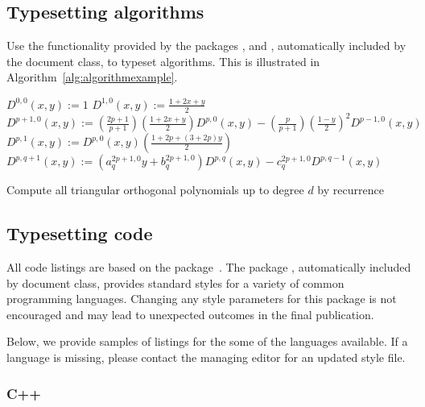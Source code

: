 \documentclass{ansarticle}
\begin{document}
\subsection{Typesetting algorithms}

Use the functionality provided by the packages ,
 and , automatically included by
the  document class, to typeset algorithms. This is
illustrated in Algorithm~\ref{alg:algorithmexample}.

\begin{algorithm}
  \begin{algorithmic}
    \State $D^{0,0}(x,y) := 1$
    \State $D^{1,0}(x,y) := \frac{1+2x+y}{2}$
    \State $D^{p+1,0}(x,y) := \left( \frac{2p+1}{p+1} \right)
    \left( \frac{1 + 2x + y}{2} \right) D^{p,0}(x,y)
    - \left( \frac{p}{p+1} \right) \left( \frac{1-y}{2} \right)^2
    D^{p-1,0}(x,y)$
    \EndFor
    \State $D^{p,1}(x,y) := D^{p,0}(x,y) \left( \frac{1+2p+(3+2p) y}{2} \right)$
    \EndFor
    \State $D^{p,q+1}(x,y) :=
    \left( a_{q}^{2p+1,0} y + b_q^{2p+1,0} \right) D^{p,q}(x,y)
    - c_q^{2p+1,0} D^{p,q-1}(x,y)$
    \EndFor
    \EndFor
  \end{algorithmic}
  \caption{Compute all triangular orthogonal polynomials up to degree
    $d$ by recurrence}
  \label{dubalg}
\end{algorithm}

\subsection{Typesetting code}

All code listings are based on the 
package~\citep{HeinzMoses07}. The package ,
automatically included by  document class, provides
standard styles for a variety of common programming
languages. Changing any style parameters for this package is not
encouraged and may lead to unexpected outcomes in the final
publication.

Below, we provide samples of listings for the some of the languages
available. If a language is missing, please contact the managing
editor for an updated style file.

\subsubsection{C++}
\end{document}
